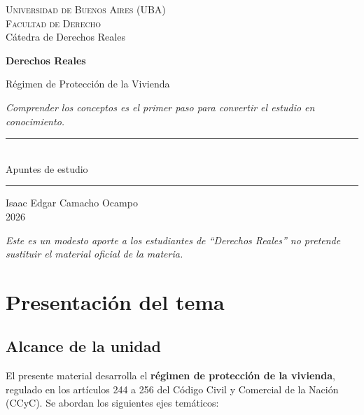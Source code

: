 \documentclass[12pt,oneside]{book}
\newcommand{\universidad}{Universidad de Buenos Aires (UBA)}
\newcommand{\facultad}{Facultad de Derecho}
\newcommand{\carrera}{C\'atedra de Derechos Reales}
\newcommand{\materia}{Derechos Reales}
\newcommand{\titulo}{R\'egimen de Protecci\'on de la Vivienda}
\newcommand{\autor}{Isaac Edgar Camacho Ocampo}
\newcommand{\anio}{2026}
\begin{document}
\begin{titlepage}
\thispagestyle{empty}
\begin{center}
\vspace*{1cm}
{\large \textsc{\universidad}}\\[0.2cm]
{\large \textsc{\facultad}}\\[0.2cm]
{\large \carrera}

\vspace{3cm}
{\Huge \textbf{\materia}}

\vspace{1cm}
{\LARGE \titulo}

\vspace{0.8cm}
\textit{Comprender los conceptos es el primer paso para convertir el estudio en conocimiento.}

\vspace{1.2cm}
\rule{0.70\textwidth}{0.5pt}\\[0.5cm]
{\large Apuntes de estudio}\\[0.5cm]
\rule{0.70\textwidth}{0.5pt}

\vfill
{\large \autor}\\[0.3cm]
{\large \anio}
\end{center}
\vfill
\begin{flushleft}
\textit{Este es un modesto aporte a los estudiantes de ``Derechos Reales'' no pretende sustituir el material oficial de la materia.}
\end{flushleft}
\end{titlepage}

\tableofcontents


\chapter[Presentaci\'on del tema]{Presentaci\'on del tema}

\section{Alcance de la unidad}

El presente material desarrolla el \textbf{r\'egimen de protecci\'on de la vivienda}, regulado en los art\'iculos 244 a 256 del C\'odigo Civil y Comercial de la Naci\'on (CCyC). Se abordan los siguientes ejes tem\'aticos:
\end{document}
